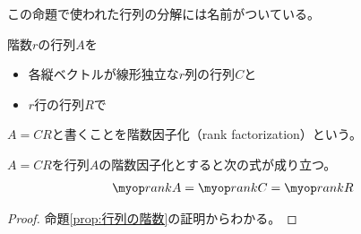 	この命題で使われた行列の分解には名前がついている。

	\begin{definition}[階数因子化]\label{def:階数因子化} %
		階数$r$の行列$A$を
		\begin{itemize}\setlength{\itemsep}{-1mm} %
			\item 各縦ベクトルが線形独立な$r$列の行列$C$と
			\item $r$行の行列$R$で
		\end{itemize} %
		$A=CR$と書くことを階数因子化（rank factorization）という。
	\end{definition} %

	\begin{proposition}[階数因子化]\label{prop:階数因子化} %
		$A=CR$を行列$A$の階数因子化とすると次の式が成り立つ。
		\begin{equation*}\begin{split} %
			\rank A = \rank C = \rank R
		\end{split}\end{equation*} %
	\end{proposition} %
	\begin{proof} %
		命題\ref{prop:行列の階数}の証明からわかる。
	\end{proof} %

